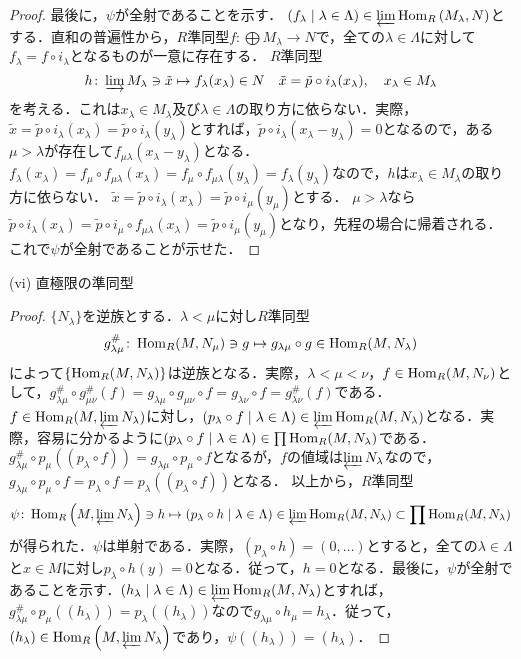\begin{proof}
  最後に，$\psi$が全射であることを示す．
  $(f_\lambda \mid \lambda \in \Lambda) \in \varprojlim\operatorname{Hom}_R\left(M_\lambda, N\right)$とする．直和の普遍性から，$R$準同型$f\colon \bigoplus M_\lambda \to N$で，全ての$\lambda \in \Lambda$に対して$f_\lambda = f \circ i_\lambda$となるものが一意に存在する．
  $R$準同型
  \[ h \colon \varinjlim M_\lambda \ni \tilde{x} \mapsto f_\lambda(x_\lambda) \in N \quad \tilde{x} = \tilde{p} \circ i_\lambda (x_\lambda),\quad x_\lambda \in M_\lambda\]
  を考える．これは$x_\lambda \in M_\lambda$及び$\lambda \in \Lambda$の取り方に依らない．実際，$\tilde{x} = \tilde{p} \circ i_\lambda (x_\lambda) = \tilde{p} \circ i_\lambda (y_\lambda)$とすれば，$\tilde{p} \circ i_\lambda (x_\lambda - y_\lambda) = 0$となるので，ある$\mu > \lambda$が存在して$f_{\mu\lambda}(x_\lambda - y_\lambda)$となる．
  $f_\lambda(x_\lambda) = f_\mu \circ f_{\mu\lambda} (x_\lambda) = f_\mu \circ f_{\mu\lambda} (y_\lambda) = f_\lambda(y_\lambda)$なので，$h$は$x_\lambda \in M_\lambda$の取り方に依らない．
  $\tilde{x} = \tilde{p} \circ i_\lambda (x_\lambda) = \tilde{p} \circ i_\mu (y_\mu)$とする．
  $\mu > \lambda$なら$\tilde{p} \circ i_\lambda (x_\lambda) = \tilde{p} \circ i_\mu \circ f_{\mu\lambda} (x_\lambda) = \tilde{p} \circ i_\mu (y_\mu)$となり，先程の場合に帰着される．これで$\psi$が全射であることが示せた．
\end{proof}

\begin{screen}
  (vi) 直極限の準同型
\end{screen}
\begin{proof}
  $\{N_\lambda\}$を逆族とする．$\lambda < \mu$に対し$R$準同型
  \[g_{\lambda\mu}^\# \colon \operatorname{Hom}_R(M, N_\mu) \ni g \mapsto g_{\lambda\mu} \circ g \in \operatorname{Hom}_R(M, N_\lambda) \]
  によって$\{\operatorname{Hom}_R(M, N_\lambda)\}$は逆族となる．実際，$\lambda < \mu < \nu$，$f \in \operatorname{Hom}_R(M, N_\nu)$として，$g_{\lambda\mu}^\# \circ g_{\mu\nu}^\# (f) = g_{\lambda\mu} \circ g_{\mu\nu} \circ f = g_{\lambda\nu} \circ f = g_{\lambda\nu}^\#(f)$である．
  $f \in \operatorname{Hom}_R(M, \varprojlim N_\lambda)$に対し，$(p_\lambda \circ f \mid \lambda \in \Lambda) \in \varprojlim \operatorname{Hom}_R(M, N_\lambda)$となる．実際，容易に分かるように$(p_\lambda \circ f \mid \lambda \in \Lambda) \in \prod \operatorname{Hom}_R(M, N_\lambda)$である．
  $g_{\lambda\mu}^\# \circ p_\mu ((p_\lambda \circ f)) = g_{\lambda\mu} \circ p_\mu \circ f$となるが，$f$の値域は$\varprojlim N_\lambda$なので，$g_{\lambda\mu} \circ p_\mu \circ f = p_\lambda \circ f = p_\lambda ((p_\lambda \circ f))$となる．
  以上から，$R$準同型
  \[\psi\colon \operatorname{Hom}_R\left(M, \varprojlim N_\lambda\right) \ni h \mapsto (p_\lambda \circ h \mid \lambda \in \Lambda) \in \varprojlim \operatorname{Hom}_R(M, N_\lambda) \subset \prod \operatorname{Hom}_R(M, N_\lambda)\]
  が得られた．$\psi$は単射である．実際，$(p_\lambda \circ h) = (0, \ldots)$とすると，全ての$\lambda \in \Lambda$と$x \in M$に対し$p_\lambda \circ h (y) = 0$となる．従って，$h=0$となる．最後に，$\psi$が全射であることを示す．$(h_\lambda \mid \lambda \in \Lambda) \in \varprojlim \operatorname{Hom}_R(M, N_\lambda)$とすれば，$g_{\lambda\mu}^\# \circ p_\mu ((h_\lambda)) = p_\lambda ((h_\lambda))$なので$g_{\lambda\mu} \circ h_\mu = h_\lambda$．従って，$(h_\lambda) \in \operatorname{Hom}_R\left(M, \varprojlim N_\lambda\right)$であり，$\psi((h_\lambda)) = (h_\lambda)$．
\end{proof}

